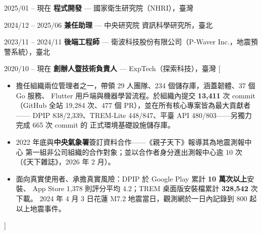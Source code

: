\documentclass[zh]{resume}
\begin{document}
\begin{experiences}
  \experience%
    {2025/01 -- 現在}%
    {\textbf{程式開發} --- 國家衛生研究院（NHRI），臺灣}

  \separator{0.6em}

  \experience%
    {2024/12 -- 2025/06}%
    {\textbf{兼任助理} --- 中央研究院 資訊科學研究所，臺北}

  \separator{0.6em}

  \experience%
    {2023/11 -- 2024/11}%
    {\textbf{後端工程師} --- 衛波科技股份有限公司（P-Waver Inc.，地震預警系統），臺北}

  \separator{0.6em}

  \experience%
    {2020/10 -- 現在}%
    {\textbf{創辦人暨技術負責人} --- ExpTech（探索科技），臺灣}%
    [\begin{itemize}
      \item 擔任組織兩位管理者之一，帶領 29 人團隊、234 個儲存庫，涵蓋韌體、37 個 Go 服務、
        Flutter 用戶端與機器學習流程。於組織內提交 \textbf{13,411} 次 commit
        （GitHub 全站 19,284 次、477 個 PR），並在所有核心專案皆為最大貢獻者——
        DPIP 838/2,339、TREM-Lite 448/847、平臺 API 480/803——另獨力完成 665 次 commit 的
        正式環境基礎設施儲存庫。
      \item 2022 年底與\textbf{中央氣象署}簽訂資料合作——《親子天下》報導其為地震測報中心
        第一組非公司組織的合作對象；並以合作者身分進出測報中心逾 10 次（《天下雜誌》，2026 年 2 月）。
      \item 面向真實使用者、承擔真實風險：DPIP 於 Google Play 累計 \textbf{10 萬次以上}安裝、
        App Store 1,378 則評分平均 4.2；TREM 桌面版安裝檔累計 \textbf{328,542} 次下載。
        2024 年 4 月 3 日花蓮 M7.2 地震當日，觀測網於一日內記錄到 800 起以上地震事件。
    \end{itemize}]
\end{experiences}
\end{document}
